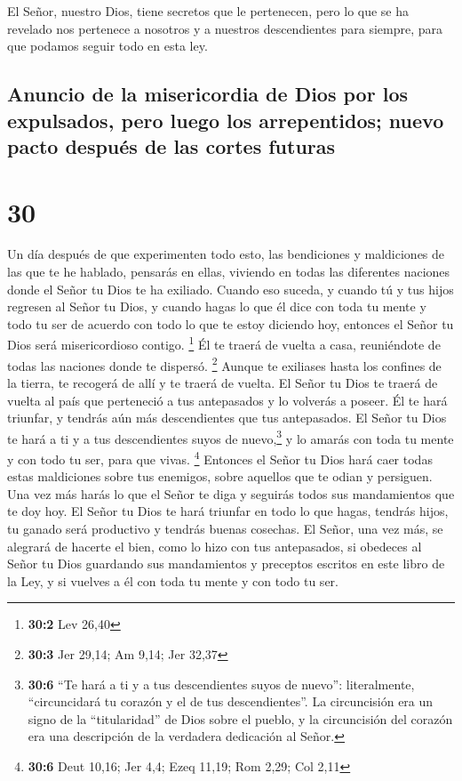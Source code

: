  El Señor, nuestro Dios, tiene secretos que le
pertenecen, pero lo que se ha revelado nos pertenece a nosotros y a
nuestros descendientes para siempre, para que podamos seguir todo en
esta ley.

\hypertarget{anuncio-de-la-misericordia-de-dios-por-los-expulsados-pero-luego-los-arrepentidos-nuevo-pacto-despuuxe9s-de-las-cortes-futuras}{%
\subsection{Anuncio de la misericordia de Dios por los expulsados, pero
luego los arrepentidos; nuevo pacto después de las cortes
futuras}\label{anuncio-de-la-misericordia-de-dios-por-los-expulsados-pero-luego-los-arrepentidos-nuevo-pacto-despuuxe9s-de-las-cortes-futuras}}

\hypertarget{section-29}{%
\section{30}\label{section-29}}

 Un día después de que experimenten todo esto, las
bendiciones y maldiciones de las que te he hablado, pensarás en ellas,
viviendo en todas las diferentes naciones donde el Señor tu Dios te ha
exiliado.  Cuando eso suceda, y cuando tú y tus hijos
regresen al Señor tu Dios, y cuando hagas lo que él dice con toda tu
mente y todo tu ser de acuerdo con todo lo que te estoy diciendo hoy,
entonces el Señor tu Dios será misericordioso contigo. \footnote{\textbf{30:2}
  Lev 26,40}  Él te traerá de vuelta a casa, reuniéndote
de todas las naciones donde te dispersó. \footnote{\textbf{30:3} Jer
  29,14; Am 9,14; Jer 32,37}  Aunque te exiliases hasta
los confines de la tierra, te recogerá de allí y te traerá de vuelta.
 El Señor tu Dios te traerá de vuelta al país que
perteneció a tus antepasados y lo volverás a poseer. Él te hará
triunfar, y tendrás aún más descendientes que tus antepasados.
 El Señor tu Dios te hará a ti y a tus descendientes suyos
de nuevo,\footnote{\textbf{30:6} ``Te hará a ti y a tus descendientes
  suyos de nuevo'': literalmente, ``circuncidará tu corazón y el de tus
  descendientes''. La circuncisión era un signo de la ``titularidad'' de
  Dios sobre el pueblo, y la circuncisión del corazón era una
  descripción de la verdadera dedicación al Señor.} y lo amarás con toda
tu mente y con todo tu ser, para que vivas. \footnote{\textbf{30:6} Deut
  10,16; Jer 4,4; Ezeq 11,19; Rom 2,29; Col 2,11} 
Entonces el Señor tu Dios hará caer todas estas maldiciones sobre tus
enemigos, sobre aquellos que te odian y persiguen.  Una
vez más harás lo que el Señor te diga y seguirás todos sus mandamientos
que te doy hoy.  El Señor tu Dios te hará triunfar en todo
lo que hagas, tendrás hijos, tu ganado será productivo y tendrás buenas
cosechas. El Señor, una vez más, se alegrará de hacerte el bien, como lo
hizo con tus antepasados,  si obedeces al Señor tu Dios
guardando sus mandamientos y preceptos escritos en este libro de la Ley,
y si vuelves a él con toda tu mente y con todo tu ser.

